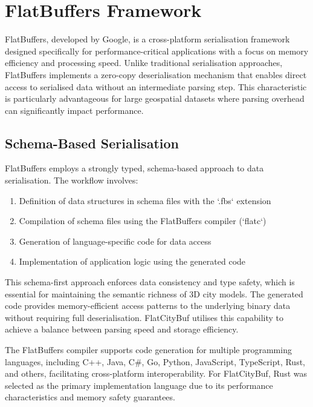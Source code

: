 \section{FlatBuffers Framework}

FlatBuffers, developed by Google, is a cross-platform serialisation framework designed specifically for performance-critical applications with a focus on memory efficiency and processing speed. Unlike traditional serialisation approaches, FlatBuffers implements a zero-copy deserialisation mechanism that enables direct access to serialised data without an intermediate parsing step. This characteristic is particularly advantageous for large geospatial datasets where parsing overhead can significantly impact performance.

\subsection{Schema-Based Serialisation}
\label{subsec:schema_based_serialisation}

FlatBuffers employs a strongly typed, schema-based approach to data serialisation. The workflow involves:

\begin{enumerate}
    \item Definition of data structures in schema files with the `.fbs` extension
    \item Compilation of schema files using the FlatBuffers compiler (`flatc`)
    \item Generation of language-specific code for data access
    \item Implementation of application logic using the generated code
\end{enumerate}

This schema-first approach enforces data consistency and type safety, which is essential for maintaining the semantic richness of 3D city models. The generated code provides memory-efficient access patterns to the underlying binary data without requiring full deserialisation. FlatCityBuf utilises this capability to achieve a balance between parsing speed and storage efficiency.

The FlatBuffers compiler supports code generation for multiple programming languages, including C++, Java, C#, Go, Python, JavaScript, TypeScript, Rust, and others, facilitating cross-platform interoperability. For FlatCityBuf, Rust was selected as the primary implementation language due to its performance characteristics and memory safety guarantees.

